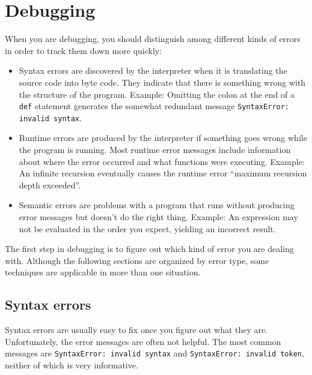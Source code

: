 \documentclass[10pt]{book}
\begin{document}
\appendix

\chapter{Debugging}

When you are debugging, you should distinguish among different
kinds of errors in order to track them down more quickly:

\begin{itemize}

\item Syntax errors are discovered by the interpreter when it is
  translating the source code into byte code.  They indicate
  that there is something wrong with the structure of the program.
  Example: Omitting the colon at the end of a {\tt def} statement
  generates the somewhat redundant message {\tt SyntaxError: invalid
    syntax}.

\item Runtime errors are produced by the interpreter if something goes
  wrong while the program is running.  Most runtime error messages
  include information about where the error occurred and what
  functions were executing.  Example: An infinite recursion eventually
  causes the runtime error ``maximum recursion depth exceeded''.

\item Semantic errors are problems with a program that runs without
  producing error messages but doesn't do the right thing.  Example:
  An expression may not be evaluated in the order you expect, yielding
  an incorrect result.

\end{itemize}

The first step in debugging is to figure out which kind of
error you are dealing with.  Although the following sections are
organized by error type, some techniques are
applicable in more than one situation.


\section{Syntax errors}

Syntax errors are usually easy to fix once you figure out what they
are.  Unfortunately, the error messages are often not helpful.
The most common messages are {\tt SyntaxError: invalid syntax} and
{\tt SyntaxError: invalid token}, neither of which is very informative.
\end{document}
